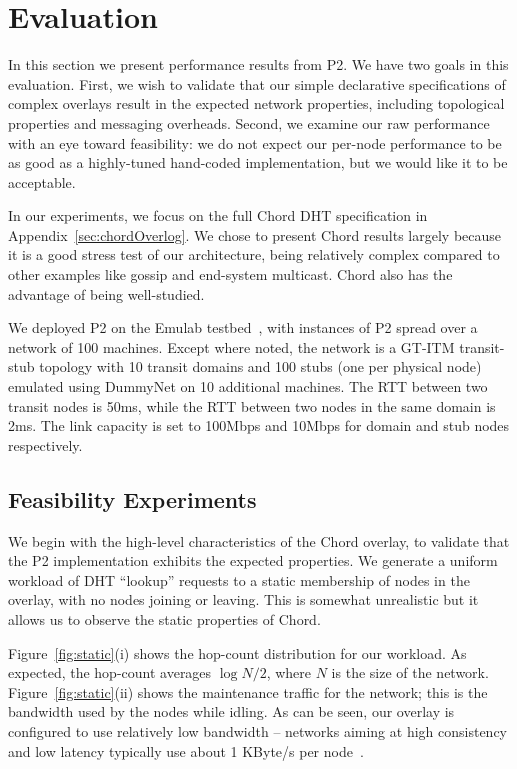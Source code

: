 \documentclass{sig-alt-full}
\def\Sys{P2\xspace}
\begin{document}
\section{Evaluation}
\label{sec:evaluation}
In this section we present performance results from \Sys.  We have two
goals 
in this evaluation.  First, we wish to validate that our simple
declarative specifications of complex overlays result in the expected
network properties, including topological properties and messaging
overheads.  Second, we examine our raw performance with an eye toward
feasibility: we do not expect our per-node performance to be as
good as a highly-tuned hand-coded implementation, but we would like it to be 
acceptable.

In our experiments, we focus on the full Chord DHT specification
in Appendix~\ref{sec:chordOverlog}.  
We chose to present Chord results largely because it is a good stress
test of our architecture, being relatively complex compared to other
examples like gossip and end-system multicast.  Chord also has the
advantage of being well-studied. 

We deployed \Sys on the Emulab testbed~\cite{White+:osdi02},
with instances of \Sys spread over a
network of 100 machines.  Except where noted, the network is a
GT-ITM transit-stub topology with 10 transit domains and 100 stubs
(one per physical node) emulated using DummyNet on 10 additional
machines. The RTT between two transit nodes is 50ms, while the RTT
between two nodes in the same domain is 2ms. The link capacity is set to
100Mbps and 10Mbps for domain and stub nodes respectively.

\subsection{Feasibility Experiments}
We begin with the
high-level characteristics of the Chord overlay, to validate that the \Sys
implementation exhibits the expected properties. We generate
a uniform workload of DHT ``lookup'' requests to a static membership
of nodes in the overlay, with no nodes joining or leaving.  This is
somewhat unrealistic but it allows us to observe the static properties
of Chord.

Figure~\ref{fig:static}(i) shows the hop-count distribution for our
workload.  As expected, the 
hop-count averages $\log N/2$, where $N$ is the size of the network.
Figure~\ref{fig:static}(ii) shows the maintenance traffic for the
network; this is the bandwidth used by the nodes while idling.  As can
be seen, our overlay is configured to use relatively low bandwidth --
networks aiming at high consistency and low latency typically use
about 1 KByte/s per node~\cite{rhea_usenix_2004}. 
\end{document}
